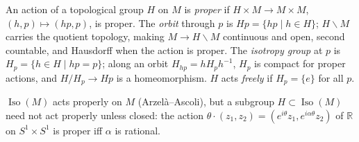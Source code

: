 \begin{definition}
  \label{def:pet-ch5-proper-action}
  An action of a topological group $H$ on $M$ is \emph{proper} if
  $H\times M\to M\times M$, $(h,p)\mapsto(hp,p)$, is proper. The \emph{orbit}
  through $p$ is $Hp=\{hp\mid h\in H\}$; $H\backslash M$ carries the quotient
  topology, making $M\to H\backslash M$ continuous and open, second countable, and
  Hausdorff when the action is proper. The \emph{isotropy group} at $p$ is
  $H_p=\{h\in H\mid hp=p\}$; along an orbit $H_{hp}=hH_ph^{-1}$, $H_p$ is compact
  for proper actions, and $H/H_p\to Hp$ is a homeomorphism. $H$ acts \emph{freely}
  if $H_p=\{e\}$ for all $p$.
\end{definition}

\begin{example}
  \label{ex:pet-ch5-nonproper-action}
  $\operatorname{Iso}(M)$ acts properly on $M$ (Arzelà–Ascoli), but a subgroup
  $H\subset\operatorname{Iso}(M)$ need not act properly unless closed: the action
  $\theta\cdot(z_1,z_2)=(e^{i\theta}z_1,e^{i\alpha\theta}z_2)$ of $\mathbb R$ on
  $S^1\times S^1$ is proper iff $\alpha$ is rational.
\end{example}

